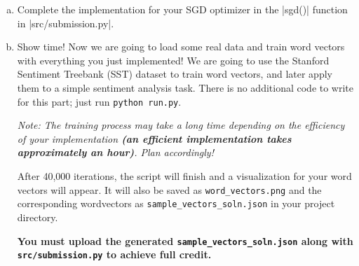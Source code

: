\begin{enumerate}[(a)]
    \item {} Complete the implementation for your SGD optimizer in the |sgd()| function in |src/submission.py|.
    
    \item {} Show time! Now we are going to load some real data and train word vectors with everything you just implemented! We are going to use the Stanford Sentiment Treebank (SST) dataset to train word vectors, and later apply them to a simple sentiment analysis task. There is no additional code to write for this part; just run \texttt{python run.py}.
            
    \emph{Note: The training process may take a long time depending on the efficiency of your implementation \textbf{(an efficient implementation takes approximately an hour)}. Plan accordingly!}

    
    After 40,000 iterations, the script will finish and a visualization for your word vectors will appear. It will also be saved as \texttt{word\_vectors.png} and the corresponding wordvectors as \texttt{sample\_vectors\_soln.json} in your project directory.

    \textbf{You must upload the generated \texttt{sample\_vectors\_soln.json} along with \texttt{src/submission.py} to achieve full credit.}
\end{enumerate}